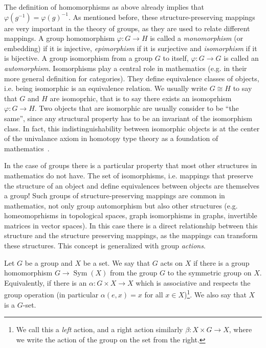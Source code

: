 The definition of homomorphisms as above already implies that $\varphi(g^{-1}) = \varphi(g)^{-1}$.
As mentioned before, these structure-preserving mappings are very important in the theory of groups, as they are used to relate different mappings. 
A group homomorphism $\varphi : G \rightarrow H$ is called a \emph{monomorphism} (or embedding) if it is injective, \emph{epimorphism} if it is surjective and \emph{isomorphism} if it is bijective.
A group isomorphism from a group $G$ to itself, $\varphi : G \rightarrow G$ is called an \emph{automorphism}.
Isomorphisms play a central role in mathematics (e.g. in their more general definition for categories).
They define equivalence classes of objects, i.e. being isomorphic is an equivalence relation. We usually write $G \cong H$ to say that $G$ and $H$ are isomoprhic, that is to say there exists an isomoprhism $\varphi: G \rightarrow H$.
Two objects that are isomorphic are usually consider to be ``the same'', since any structural property has to be an invariant of the isomorphism class. 
In fact, this indistinguishability between isomorphic objects is at the center of the univalance axiom in homotopy type theory as a foundation of mathematics~\cite{hott_book}.

In the case of groups there is a particular property that most other structures in mathematics do not have.
The set of isomorphisms, i.e. mappings that preserve the structure of an object and define equivalences between objects are themselves a group!
Such groups of structure-preserving mappings are common in mathematics, not only group automorphism but also other structures (e.g. homeomoprhisms in topological spaces, graph isomorphisms in graphs, invertible matrices in vector spaces).
In this case there is a direct relationship between this structure and the structure preserving mappings, as the mappings can transform these structures.
This concept is generalized with group \emph{actions}. 
\begin{defn}
    Let $G$ be a group and $X$ be a set.
We say that $G$ acts on $X$ if there is a group homomorphism $G \rightarrow \operatorname{Sym}(X)$ from the group $G$ to the symmetric group on $X$. 
Equivalently, if there is an $\alpha : G \times X \rightarrow X$ which is associative and respects the group operation (in particular $\alpha(e,x) = x$ for all $x \in X$)\footnote{We
call this a \emph{left} action, and a right action similarly $\beta  : X \times G \rightarrow X$, where we write the action of the group on the set from the right.}. 
We also say that $X$ is a $G$-set.
\end{defn}

